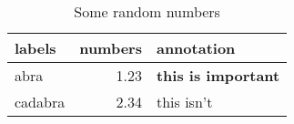 \begin{table}[htbp]
    \centering
    \begin{tabular}{lrl}
    \toprule
    labels   & numbers & annotation \\
    \midrule
    abra     &  1.23   & \textbf{this is important}\\
    cadabra  &  2.34   & this isn't\\
    \bottomrule
    \end{tabular}
    \caption{Some random numbers}
    \label{tab:random}
\end{table}